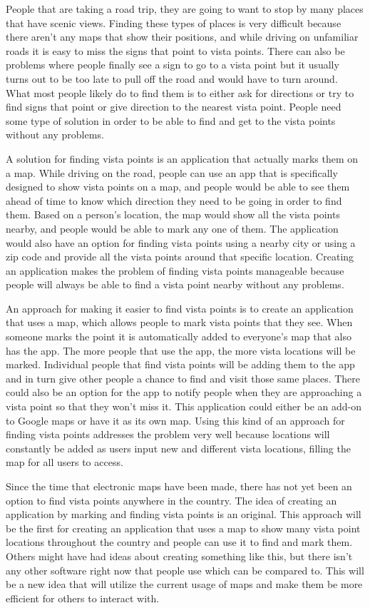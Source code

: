\documentclass[12pt]{article}
\begin{document}
People that are taking a road trip, they are going to want to stop by many places that have scenic views. Finding these types of places is very difficult because there aren’t any maps that show their positions, and while driving on unfamiliar roads it is easy to miss the signs that point to vista points. There can also be problems where people finally see a sign to go to a vista point but it usually turns out to be too late to pull off the road and would have to turn around. What most people likely do to find them is to either ask for directions or try to find signs that point or give direction to the nearest vista point. People need some type of solution in order to be able to find and get to the vista points without any problems.

A solution for finding vista points is an application that actually marks them on a map. While driving on the road, people can use an app that is specifically designed to show vista points on a map, and people would be able to see them ahead of time to know which direction they need to be going in order to find them. Based on a person’s location, the map would show all the vista points nearby, and people would be able to mark any one of them. The application would also have an option for finding vista points using a nearby city or using a zip code and provide all the vista points around that specific location. Creating an application makes the problem of finding vista points manageable because people will always be able to find a vista point nearby without any problems.

An approach for making it easier to find vista points is to create an application that uses a map, which allows people to mark vista points that they see. When someone marks the point it is automatically added to everyone’s map that also has the app. The more people that use the app, the more vista locations will be marked. Individual people that find vista points will be adding them to the app and in turn give other people a chance to find and visit those same places. There could also be an option for the app to notify people when they are approaching a vista point so that they won’t miss it. This application could either be an add-on to Google maps or have it as its own map. Using this kind of an approach for finding vista points addresses the problem very well because locations will constantly be added as users input new and different vista locations, filling the map for all users to access.

Since the time that electronic maps have been made, there has not yet been an option to find vista points anywhere in the country. The idea of creating an application by marking and finding vista points is an original. This approach will be the first for creating an application that uses a map to show many vista point locations throughout the country and people can use it to find and mark them. Others might have had ideas about creating something like this, but there isn’t any other software right now that people use which can be compared to. This will be a new idea that will utilize the current usage of maps and make them be more efficient for others to interact with.
\end{document}
